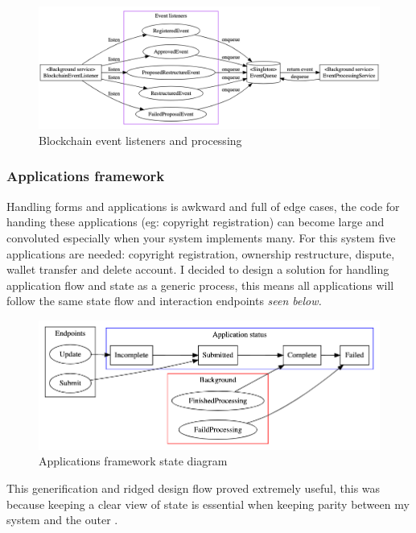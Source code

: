 \begin{figure}[H]
\caption{Blockchain event listeners and processing}
\centering
\includegraphics[width=\textwidth,height=0.5\textheight,keepaspectratio]{images/operational/Event-Listening}
\end{figure}

\subsubsection{Applications framework}

Handling forms and applications is awkward and full of edge cases, the code for handing these applications (eg: copyright registration) can become large and convoluted especially when your system implements many. For this system five applications are needed: copyright registration, ownership restructure, dispute, wallet transfer and delete account. I decided to design a solution for handling application flow and state as a generic process, this means all applications will follow the same state flow and interaction endpoints \textit{seen below.} 

\begin{figure}[H]
\caption{Applications framework state diagram}
\centering
\includegraphics[width=\textwidth,height=0.5\textheight,keepaspectratio]{images/operational/applications-status}
\end{figure}

This generification and ridged design flow proved extremely useful, this was because keeping a clear view of state is essential when keeping parity between my system and the outer .

